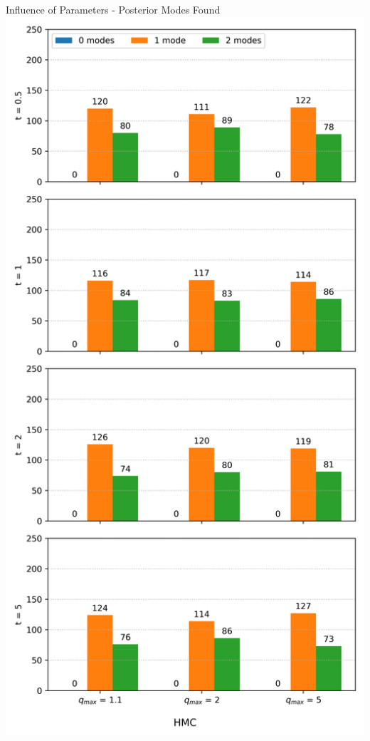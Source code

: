 \documentclass[]{beamer}
\begin{document}
\begin{frame}{Influence of Parameters - Posterior Modes Found}
    \includegraphics[scale=0.25]{figs/results/params/modes_found_hmc.png}
  \end{frame}
\end{document}
